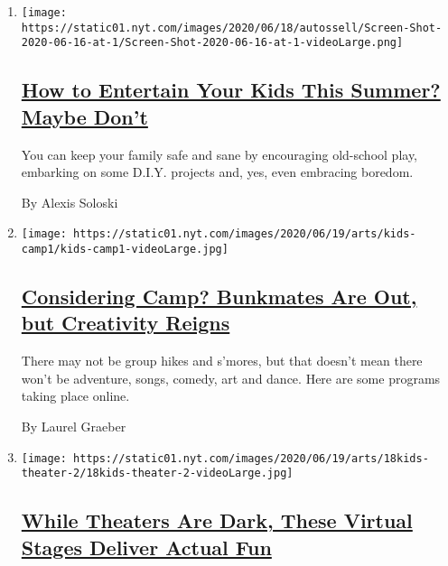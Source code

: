 \begin{enumerate}
\def\labelenumi{\arabic{enumi}.}
\item
  \texttt{[image: https://static01.nyt.com/images/2020/06/18/autossell/Screen-Shot-2020-06-16-at-1/Screen-Shot-2020-06-16-at-1-videoLarge.png]}

  \hypertarget{how-to-entertain-your-kids-this-summer-maybe-dont}{%
  \subsection{\texorpdfstring{\href{/2020/06/18/arts/kids-summer-activities-virus.html}{How
  to Entertain Your Kids This Summer? Maybe
  Don't}}{How to Entertain Your Kids This Summer? Maybe Don't}}\label{how-to-entertain-your-kids-this-summer-maybe-dont}}

  You can keep your family safe and sane by encouraging old-school play,
  embarking on some D.I.Y. projects and, yes, even embracing boredom.

  By Alexis Soloski
\item
  \texttt{[image: https://static01.nyt.com/images/2020/06/19/arts/kids-camp1/kids-camp1-videoLarge.jpg]}

  \hypertarget{considering-camp-bunkmates-are-out-but-creativity-reigns}{%
  \subsection{\texorpdfstring{\href{/2020/06/18/arts/kids-summer-camps-virtual.html}{Considering
  Camp? Bunkmates Are Out, but Creativity
  Reigns}}{Considering Camp? Bunkmates Are Out, but Creativity Reigns}}\label{considering-camp-bunkmates-are-out-but-creativity-reigns}}

  There may not be group hikes and s'mores, but that doesn't mean there
  won't be adventure, songs, comedy, art and dance. Here are some
  programs taking place online.

  By Laurel Graeber
\item
  \texttt{[image: https://static01.nyt.com/images/2020/06/19/arts/18kids-theater-2/18kids-theater-2-videoLarge.jpg]}

  \hypertarget{while-theaters-are-dark-these-virtual-stages-deliver-actual-fun}{%
  \subsection{\texorpdfstring{\href{/2020/06/18/theater/kids-summer-theater-virtual.html}{While
  Theaters Are Dark, These Virtual Stages Deliver Actual
  Fun}}{While Theaters Are Dark, These Virtual Stages Deliver Actual Fun}}\label{while-theaters-are-dark-these-virtual-stages-deliver-actual-fun}}


\end{enumerate}
